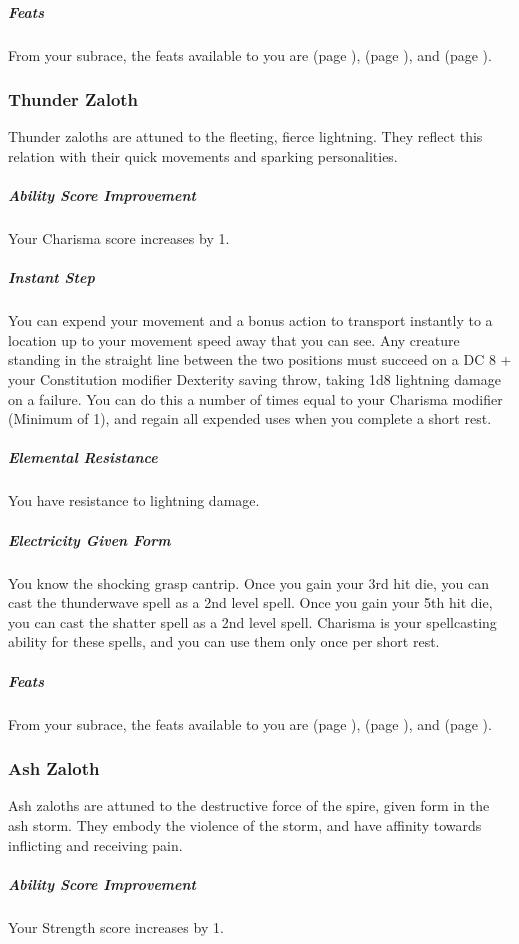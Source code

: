     \subparagraph{Feats} From your subrace, the feats available to you are
    \textbf{} (page \pageref{feat::}),
    \textbf{} (page \pageref{feat::}), and
    \textbf{} (page \pageref{feat::}).

\subsubsection{Thunder Zaloth}
    Thunder zaloths are attuned to the fleeting, fierce lightning.
    They reflect this relation with their quick movements and sparking personalities.

    \subparagraph{Ability Score Improvement} Your Charisma score increases by 1.

    \subparagraph{Instant Step} You can expend your movement and a bonus action to transport instantly to a location up to your movement speed away that you can see.
    Any creature standing in the straight line between the two positions must succeed on a DC 8 + your Constitution modifier Dexterity saving throw, taking 1d8 lightning damage on a failure.
    You can do this a number of times equal to your Charisma modifier (Minimum of 1), and regain all expended uses when you complete a short rest.

    \subparagraph{Elemental Resistance} You have resistance to lightning damage.

    \subparagraph{Electricity Given Form} You know the shocking grasp cantrip.
    Once you gain your 3rd hit die, you can cast the thunderwave spell as a 2nd level spell.
    Once you gain your 5th hit die, you can cast the shatter spell as a 2nd level spell.
    Charisma is your spellcasting ability for these spells, and you can use them only once per short rest.

    \subparagraph{Feats} From your subrace, the feats available to you are
    \textbf{} (page \pageref{feat::}),
    \textbf{} (page \pageref{feat::}), and
    \textbf{} (page \pageref{feat::}).

\subsubsection{Ash Zaloth}
    Ash zaloths are attuned to the destructive force of the spire, given form in the ash storm.
    They embody the violence of the storm, and have affinity towards inflicting and receiving pain.

    \subparagraph{Ability Score Improvement} Your Strength score increases by 1.

